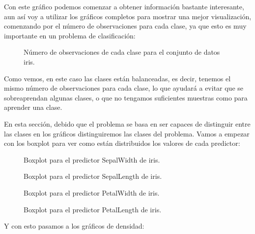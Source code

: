 Con este gráfico podemos comenzar a obtener información bastante interesante, aun así voy a utilizar los gráficos completos para mostrar una mejor visualización, comenzando por el número de observaciones para cada clase, ya que esto es muy importante en un problema de clasificación:

\begin{figure}[H]
	\centering
	
	\caption{Número de observaciones de cada clase para el conjunto de datos iris.}
	\label{fig:recuento_clases_iris}
\end{figure}

Como vemos, en este caso las clases están balanceadas, es decir, tenemos el mismo número de observaciones para cada clase, lo que ayudará a evitar que se sobreaprendan algunas clases, o que no tengamos suficientes muestras como para aprender una clase.

En esta sección, debido que el problema se basa en ser capaces de distinguir entre las clases en los gráficos distinguiremos las clases del problema. Vamos a empezar con los boxplot para ver como están distribuidos los valores de cada predictor:

\begin{figure}[H]
	\centering
	
	\caption{Boxplot para el predictor SepalWidth de iris.}
	\label{fig:boxplot_iris_SepalWidth}
\end{figure}


\begin{figure}[H]
	\centering
	
	\caption{Boxplot para el predictor SepalLength de iris.}
	\label{fig:densidad_iris_SepalLength}
\end{figure}


\begin{figure}[H]
	\centering
	
	\caption{Boxplot para el predictor PetalWidth de iris.}
	\label{fig:boxplot_iris_PetalWidth}
\end{figure}


\begin{figure}[H]
	\centering
	
	\caption{Boxplot para el predictor PetalLength de iris.}
	\label{fig:boxplot_iris_PetalLength}
\end{figure}


Y con esto pasamos a los gráficos de densidad:

